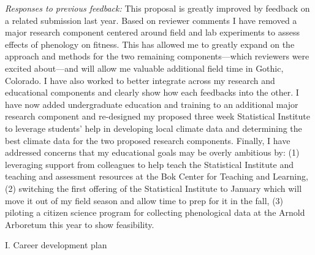 \documentclass[12pt,a4paper,oneside]{article}
\begin{document}
\emph{Responses to previous feedback:} This proposal is greatly improved by feedback on a related submission last year. Based on reviewer comments I have removed a major research component centered around field and lab experiments to assess effects of phenology on fitness. This has allowed me to greatly expand on the approach and methods for the two remaining components---which reviewers were excited about---and will allow me valuable additional field time in Gothic, Colorado. I have also worked to better integrate across my research and educational components and clearly show how each feedbacks into the other. I have now added undergraduate education and training to an additional major research component and re-designed my proposed three week Statistical Institute to leverage students' help in developing local climate data and determining the best climate data for the two proposed research components. Finally, I have addressed concerns that my educational goals may be overly ambitious by: (1) leveraging support from colleagues to help teach the Statistical Institute and teaching and assessment resources at the Bok Center for Teaching and Learning, (2) switching the first offering of the Statistical Institute to January which will move it out of my field season and allow time to prep for it in the fall, (3) piloting a citizen science program for collecting phenological data at the Arnold Arboretum this year to show feasibility. \\

\begin{center}
{\sc I. Career development plan}
\end{center}
\end{document}
